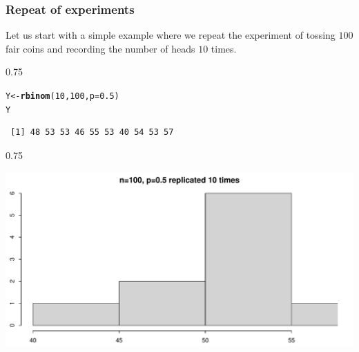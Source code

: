 \documentclass{beamer}\usepackage[]{graphicx}\usepackage[]{color}
\makeatletter
\newcommand{\hlnum}[1]{\textcolor[rgb]{0.2,0.2,0.2}{#1}}%
\newcommand{\hlstd}[1]{\textcolor[rgb]{0.102,0.102,0.102}{#1}}%
\newcommand{\hlkwb}[1]{\textcolor[rgb]{0.102,0.102,0.102}{#1}}%
\newcommand{\hlkwc}[1]{\textcolor[rgb]{0.2,0.2,0.2}{#1}}%
\newcommand{\hlkwd}[1]{\textcolor[rgb]{0.102,0.102,0.102}{\textbf{#1}}}%
\newenvironment{kframe}{%
 \def\at@end@of@kframe{}%
 \ifinner\ifhmode%
  \def\at@end@of@kframe{\end{minipage}}%
  \begin{minipage}{\columnwidth}%
 \fi\fi%
 \def\FrameCommand##1{\hskip\@totalleftmargin \hskip-\fboxsep
 \colorbox{shadecolor}{##1}\hskip-\fboxsep
     \hskip-\linewidth \hskip-\@totalleftmargin \hskip\columnwidth}%
 \MakeFramed {\advance\hsize-\width
   \@totalleftmargin\z@ \linewidth\hsize
   \@setminipage}}%
 {\par\unskip\endMakeFramed%
 \at@end@of@kframe}
\newenvironment{knitrout}{}{} %
\renewenvironment{knitrout}{\begin{spacing}{0.75}\begin{tiny}}{\end{tiny}\end{spacing}}
\makeatother
\begin{document}
\begin{frame}[fragile]
\frametitle{Repeat of experiments}

Let us start with a simple example where we repeat the experiment of tossing
$100$ fair coins and recording the number of heads $10$ times.

\begin{knitrout}\small
{}\color{fgcolor}\begin{kframe}
\begin{alltt}
\hlstd{Y} \hlkwb{<-} \hlkwd{rbinom}\hlstd{(}\hlnum{10}\hlstd{,} \hlnum{100}\hlstd{,} \hlkwc{p}\hlstd{=}\hlnum{0.5}\hlstd{)}
\hlstd{Y}
\end{alltt}
\begin{verbatim}
 [1] 48 53 53 46 55 53 40 54 53 57
\end{verbatim}
\end{kframe}
\end{knitrout}

\end{frame}

\begin{frame}[fragile]

\begin{knitrout}\small
{}\color{fgcolor}

{\centering \includegraphics[width=0.89\linewidth]{figure/graphics-unnamed-chunk-2-1} 

}



\end{knitrout}

\end{frame}
\end{document}
